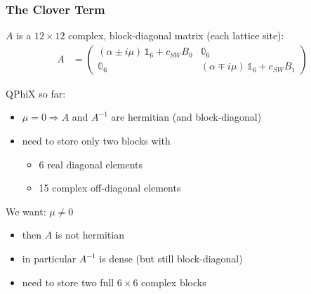 \documentclass{beamer}
\begin{document}
  \begin{frame}
    \frametitle{The Clover Term}

    $A$ is a $12 \times 12$ complex, block-diagonal matrix (each lattice site):
    \begin{align*}
      A &=
      \begin{pmatrix}
        ( \alpha \pm i \mu ) \, \mathbb{1}_6 + c_{SW} B_0 & \mathbb 0_6 \\
        \mathbb 0_6 & (\alpha \mp i \mu) \, \mathbb{1}_6 + c_{SW} B_1
      \end{pmatrix}
    \end{align*}
    \vfill

    QPhiX so far:
    \begin{itemize}
      \item $\mu = 0 \Rightarrow A$ and $A^{-1}$ are hermitian (and block-diagonal)
      \item need to store only two blocks with
        \begin{itemize}
          \item 6 real diagonal elements
          \item 15 complex off-diagonal elements
        \end{itemize}
    \end{itemize}
    \vfill

    We want: $\mu \neq 0$
    \begin{itemize}
      \item then $A$ is not hermitian
      \item in particular $A^{-1}$ is dense (but still block-diagonal)
      \item need to store two full $6 \times 6$ complex blocks
    \end{itemize}
    \vfill

  \end{frame}

\end{document}

